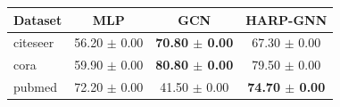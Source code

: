 \begin{tabular}{lccc}
\toprule
Dataset & MLP & GCN & HARP-GNN \\
\midrule
citeseer & 56.20 $\pm$ 0.00 & \textbf{70.80 $\pm$ 0.00} & 67.30 $\pm$ 0.00 \\
cora & 59.90 $\pm$ 0.00 & \textbf{80.80 $\pm$ 0.00} & 79.50 $\pm$ 0.00 \\
pubmed & 72.20 $\pm$ 0.00 & 41.50 $\pm$ 0.00 & \textbf{74.70 $\pm$ 0.00} \\
\bottomrule
\end{tabular}
